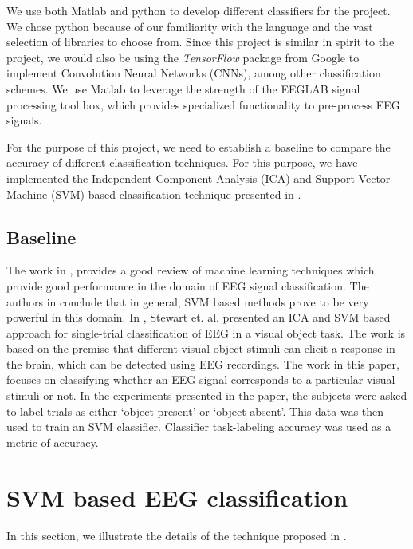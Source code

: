 \documentclass{article} %
\begin{document}
We use both Matlab and python to develop different classifiers for the project. We chose python because of our familiarity with the language and the vast selection of libraries to choose from. Since this project is similar in spirit to the  project, we would also be using the \textit{TensorFlow} package from Google to implement Convolution Neural Networks (CNNs), among other classification schemes. We use Matlab to leverage the strength of the EEGLAB signal processing tool box, which provides specialized functionality to pre-process EEG signals. 

For the purpose of this project, we need to establish a baseline to compare the accuracy of different classification techniques. For this purpose, we have implemented the Independent Component Analysis (ICA) and Support Vector Machine (SVM) based classification technique presented in \cite{Stewart20141}.

\subsection{Baseline}
The work in \cite{review}, provides a good review of machine learning techniques which provide good performance in the domain of EEG signal classification. The authors in \cite{review} conclude that in general, SVM based methods prove to be very powerful in this domain. In \cite{Stewart20141}, Stewart et. al. presented an ICA and SVM based approach for single-trial classification of EEG in a visual object task. The work is based on the premise that different visual object stimuli can elicit a response in the brain, which can be detected using EEG recordings. The work in this paper, focuses on classifying whether an EEG signal corresponds to a particular visual stimuli or not. In the experiments presented in the paper, the subjects were asked to label trials as either ‘object present’ or ‘object absent’. This data was then used to train an SVM classifier. Classifier task-labeling accuracy was used as a metric of accuracy. 

\section{SVM based EEG classification}
In this section, we illustrate the details of the technique proposed in \cite{Stewart20141}.
\end{document}
